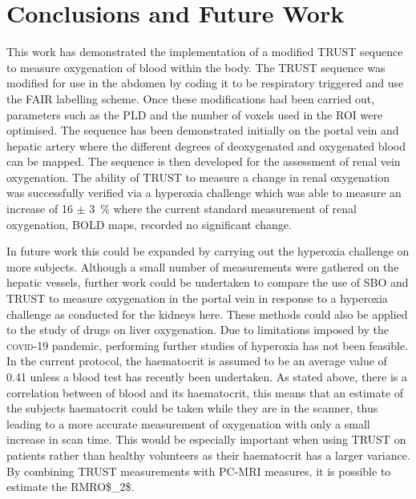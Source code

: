 \newpage
\section{Conclusions and Future Work}

This work has demonstrated the implementation of a modified \ac{TRUST} sequence to measure oxygenation of blood within the body. The \ac{TRUST} sequence was modified for use in the abdomen by coding it to be respiratory triggered and use the \ac{FAIR} labelling scheme. Once these modifications had been carried out, parameters such as the \ac{PLD} and the number of voxels used in the \ac{ROI} were optimised. The sequence has been demonstrated initially on the portal vein and hepatic artery where the different degrees of deoxygenated and oxygenated blood can be mapped. The sequence is then developed for the assessment of renal vein oxygenation. The ability of \ac{TRUST} to measure a change in renal oxygenation was successfully verified via a hyperoxia challenge which was able to measure an increase of 16 $\pm$ 3~\% where the current standard measurement of renal oxygenation, \ac{BOLD} \ttwostar maps, recorded no significant change.

In future work this could be expanded by carrying out the hyperoxia challenge on more subjects. Although a small number of measurements were gathered on the hepatic vessels, further work could be undertaken to compare the use of \ac{SBO} and \ac{TRUST} to measure oxygenation in the portal vein in response to a hyperoxia challenge as conducted for the kidneys here. These methods could also be applied to the study of drugs on liver oxygenation. Due to limitations imposed by the \textsc{covid}-19 pandemic, performing further studies of hyperoxia has not been feasible. In the current protocol, the haematocrit is assumed to be an average value of 0.41 unless a blood test has recently been undertaken. As stated above, there is a correlation between \tone of blood and its haematocrit, this means that an estimate of the subjects haematocrit could be taken while they are in the scanner, thus leading to a more accurate measurement of oxygenation with only a small increase in scan time. This would be especially important when using \ac{TRUST} on patients rather than healthy volunteers as their haematocrit has a larger variance. By combining \ac{TRUST} measurements with \ac{PC}-\ac{MRI} measures, it is possible to estimate the \acf{RMRO$_2$}.

